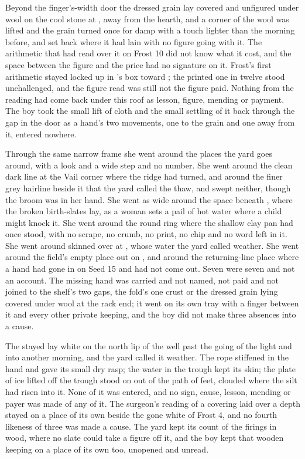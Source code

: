 Beyond the finger's-width door the dressed grain lay covered and unfigured under wool on the cool stone at , away from the hearth, and a corner of the wool was lifted and the grain turned once for damp with a touch lighter than the morning before, and set back where it had lain with no figure going with it. The arithmetic that had read over it on Frost 10 did not know what it cost, and the space between the figure and the price had no signature on it. Frost's first arithmetic stayed locked up  in 's box toward ; the printed one in twelve stood unchallenged, and the figure read was still not the figure paid. Nothing from the reading had come back under this roof as lesson, figure, mending or payment. The boy took the small lift of cloth and the small settling of it back through the gap in the door as a hand's two movements, one to the grain and one away from it, entered nowhere.

Through the same narrow frame she went around the places the yard goes around, with a look and a wide step and no number. She went around the clean dark line at the Vail corner where the  ridge had turned, and around the finer grey hairline beside it that the yard called the thaw, and swept neither, though the broom was in her hand. She went as wide around the space beneath , where the broken birth-slates lay, as a woman sets a pail of hot water where a child might knock it. She went around the round ring where the shallow clay pan had once stood, with no scrape, no crumb, no print, no chip and no word left in it. She went around  skinned over at , whose water the yard called weather. She went around the field's empty place out on , and around the returning-line place where a hand had gone in on Seed 15 and had not come out. Seven were seven and not an account. The missing hand was carried and not named, not paid and not joined to the shelf's two gaps, the fold's one crust or the dressed grain lying covered under wool at the rack end; it went on its own tray with a finger between it and every other private keeping, and the boy did not make three absences into a cause.

The stayed  lay white on the north lip of the well past the going of the light and into another morning, and the yard called it weather. The rope stiffened in the hand and gave its small dry rasp; the water in the trough kept its skin; the plate of ice lifted off the trough stood on  out of the path of feet, clouded where the silt had risen into it. None of it was entered, and no sign, cause, lesson, mending or payer was made of any of it. The surgeon's reading of a covering laid over a depth stayed on a place of its own beside the gone white of Frost 4, and no fourth likeness of three was made a cause. The yard kept its count of the firings in wood, where no slate could take a figure off it, and the boy kept that wooden keeping on a place of its own too, unopened and unread.

